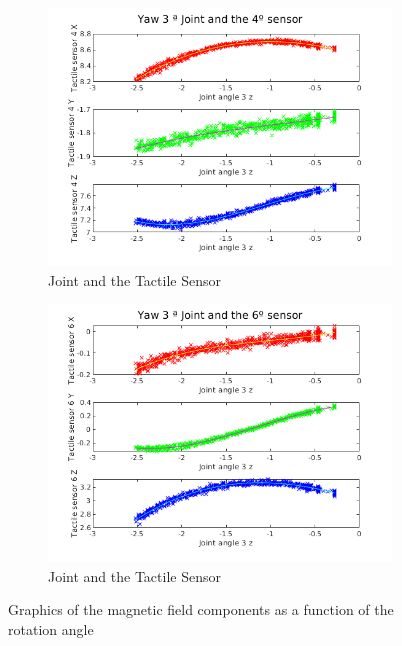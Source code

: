 \begin{figure}
\centering
\begin{subfigure}{.5\textwidth}
  \centering
  \includegraphics[width=1\linewidth]{images/3Joint_4sensor.png}
  \caption{ Joint and the  Tactile Sensor}
  \label{fig:3Joint_4sensor}
\end{subfigure}%
\begin{subfigure}{.5\textwidth}
  \centering
  \includegraphics[width=1\linewidth]{images/3Joint_6sensor.png}
  \caption{ Joint and the  Tactile Sensor}
  \label{fig:3Joint_6sensor}
\end{subfigure}
\caption{Graphics of the magnetic field components as a function of the  rotation angle }
\label{fig:3Joint}
\end{figure}

